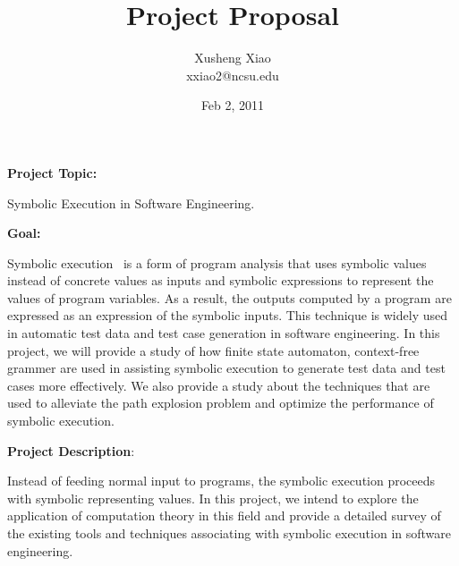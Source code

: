 \documentclass[times, 10pt,onecolumn]{article}
\title{Project Proposal}
\author{
Xusheng Xiao\\
\small{xxiao2@ncsu.edu}\\
}
\date{Feb 2, 2011}
\begin{document}
\maketitle

\begin{flushleft}
\textbf{Project Topic:}\end{flushleft} Symbolic Execution in Software Engineering.\\

\begin{flushleft}
\textbf{Goal:}\end{flushleft}
Symbolic execution~\cite{symbolic} is a form of program analysis that uses symbolic values instead of concrete values as inputs and symbolic expressions to represent the values of program variables. As a result, the outputs computed by a program are expressed as an expression of the symbolic inputs. This technique is widely used in automatic test data and test case generation in software engineering. In this project, we will provide a study of how finite state automaton, context-free grammer are used in assisting symbolic execution to generate test data and test cases more effectively. We also provide a study about the techniques that are used to alleviate the path explosion problem and optimize the performance of symbolic execution. 
\\

\begin{flushleft}
\textbf{Project Description}:\end{flushleft}
Instead of feeding normal input to programs, the symbolic execution proceeds with symbolic representing values\cite{symbolic}. In this project, we intend to explore the application of computation theory in this field and provide a detailed survey of the existing tools and techniques associating with symbolic execution in software engineering. 
\end{document}
